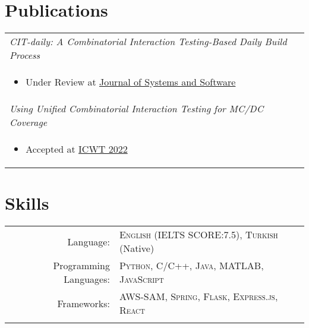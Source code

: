 \documentclass[a4paper,10pt]{article} %
\begin{document}


\section{Publications}

\begin{longtable}{p{12cm}}

\emph{CIT-daily: A Combinatorial Interaction Testing-Based Daily Build Process} \\ \begin{itemize} \item \footnotesize{Under Review at \href{https://www.journals.elsevier.com/journal-of-systems-and-software}{Journal of Systems and Software}} \end{itemize}\\

\emph{Using Unified Combinatorial Interaction Testing for MC/DC Coverage} \\ \begin{itemize} \item \footnotesize{Accepted at \href{https://icst2022.vrain.upv.es/home/iwct-2022}{ICWT 2022}} \end{itemize}\\

\end{longtable}




\section{Skills}

\begin{longtable}{rl}
Language: & \textsc{English} \small(IELTS SCORE:7.5), \textsc{Turkish} \small(Native)\\

Programming Languages: & \textsc{Python}, \textsc{C/C++}, \textsc{Java}, \textsc{MATLAB}, \textsc{JavaScript}\\

Frameworks: & \textsc{AWS-SAM}, \textsc{Spring}, \textsc{Flask}, \textsc{Express.js}, \textsc{React}\\
&\\
\end{longtable}
\end{document}
